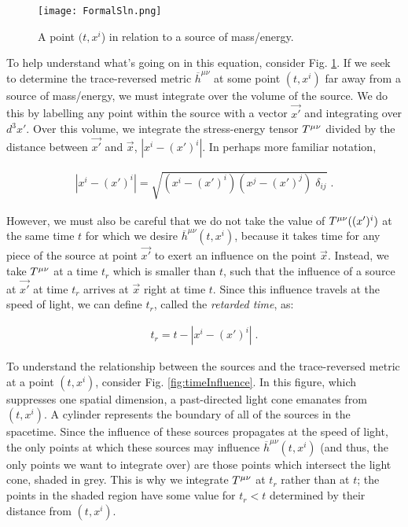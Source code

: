 \documentclass[10pt]{article}
\begin{document}
              	              	
\begin{figure}[h]
\centering
\texttt{[image: FormalSln.png]}
\caption{A point $(t,x^i$) in relation to a source of mass/energy.}
\label{fig:FormalSln}
\end{figure}
              	
To help understand what's going on in this equation, consider Fig. \ref{fig:FormalSln}. If we seek to determine the trace-reversed metric $\overline{h}^{\mu\nu}$ at some point $(t,x^i)$ far away from a source of mass/energy, we must integrate over the volume of the source. We do this by labelling any point within the source with a vector $\vec{x'}$ and integrating over $d^3x'$. Over this volume, we integrate the stress-energy tensor $\tensor{T}{^\mu^\nu}$ divided by the distance between $\vec{x'}$ and $\vec{x}$, $|x^i-(x')^i|$. In perhaps more familiar notation,
              	
\begin{align}\label{eq:distanceMag}
|x^i-(x')^i| = \sqrt{(x^i-(x')^i)(x^j-(x')^j) \; \delta_{ij}}\;.
\end{align}
              	
              	
However, we must also be careful that we do not take the value of $\tensor{T}{^\mu^\nu}((x')^i)$ at the same time $t$ for which we desire $\overline{h}^{\mu\nu}(t,x^i)$, because it takes time for any piece of the source at point $\vec{x'}$ to exert an influence on the point $\vec{x}$. Instead, we take $\tensor{T}{^\mu^\nu}$ at a time $t_r$ which is smaller than $t$, such that the influence of a source at $\vec{x'}$ at time $t_r$ arrives at $\vec{x}$ right at time $t$. Since this influence travels at the speed of light, we can define $t_r$, called the \textit{retarded time}, as:
              	
\begin{align}\label{eq:retardedTime}
t_r = t - |x^i-(x')^i| \;.
\end{align}
              	
To understand the relationship between the sources and the trace-reversed metric at a point $(t,x^i)$, consider Fig. \ref{fig:timeInfluence}. In this figure, which suppresses one spatial dimension, a  past-directed light cone emanates from $(t,x^i)$. A cylinder represents the boundary of all of the sources in the spacetime. Since the influence of these sources propagates at the speed of light, the only points at which these sources may influence $\overline{h}^{\mu\nu}(t,x^i)$ (and thus, the only points we want to integrate over) are those points which intersect the light cone, shaded in grey. This is why we integrate $\tensor{T}{^\mu^\nu}$ at $t_r$ rather than at $t$; the points in the shaded region have some value for $t_r < t$ determined by their distance from $(t,x^i)$.
              
\end{document}

